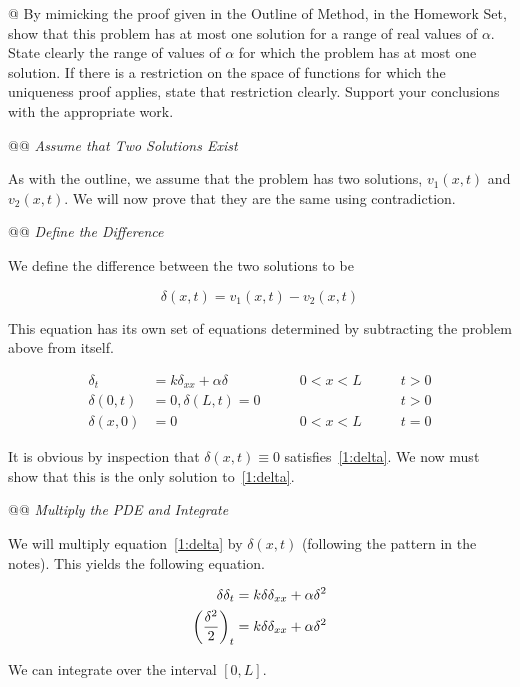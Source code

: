 \documentclass[10pt]{article}
\begin{document}
\NewList
\begin{easylist}[enumerate]
    @ By mimicking the proof given in the Outline of Method, in the Homework Set, show that this problem has at most one
    solution for a range of real values of $\alpha$. State clearly the range of values of $\alpha$ for which the problem
    has at most one solution. If there is a restriction on the space of functions for which the uniqueness proof
    applies, state that restriction clearly. Support your conclusions with the appropriate work.

    @@ \textit{Assume that Two Solutions Exist}

    As with the outline, we assume that the problem has two solutions, $v_1(x, t)$ and $v_2(x, t)$. We will now prove
    that they are the same using contradiction.

    @@ \textit{Define the Difference}

    We define the difference between the two solutions to be

    \[
        \delta(x, t) = v_1(x, t) - v_2(x, t)
    \]

    This equation has its own set of equations determined by subtracting the problem above from itself.

    \begin{align}\label{1:delta}
        \delta_t &= k \delta_{xx} + \alpha \delta \qquad & 0 < x < L \qquad & t > 0 \nonumber \\
        \delta(0, t) &= 0, \delta(L, t) = 0 \qquad && t > 0\\
        \delta(x, 0) &= 0 \qquad & 0 < x < L \qquad & t = 0 \nonumber
    \end{align}

    It is obvious by inspection that $\delta(x, t) \equiv 0$ satisfies~\eqref{1:delta}. We now must show that this is
    the only solution to~\eqref{1:delta}.

    @@ \textit{Multiply the PDE and Integrate}

    We will multiply equation~\eqref{1:delta} by $\delta(x, t)$ (following the pattern in the notes). This yields the
    following equation.

    \begin{align*}
        \delta \delta_t &= k \delta \delta_{xx} + \alpha \delta^2\\
        \left( \frac{\delta^2}{2} \right)_t &= k \delta \delta_{xx} + \alpha \delta^2
    \end{align*}

    We can integrate over the interval $[0, L]$.


\end{easylist}
\end{document}
